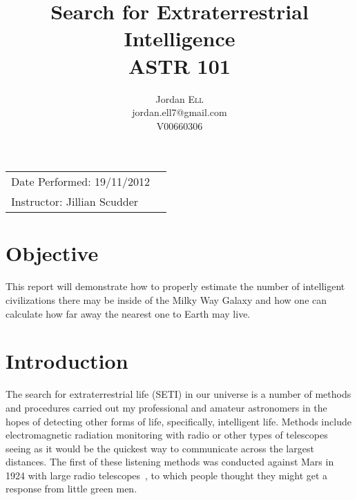 \documentclass{article}
\title{Search for Extraterrestrial Intelligence \\ ASTR 101} %
\author{Jordan \textsc{Ell} \\ jordan.ell7@gmail.com \\ V00660306} %
\begin{document}
\maketitle %

\begin{tabular}{lr}
Date Performed: 19/11/2012\\ %
Instructor: Jillian Scudder %
\end{tabular}

\setlength\parindent{0pt} %

\renewcommand{\labelenumi}{\alph{enumi}.} %


\section{Objective}

This report will demonstrate how to properly estimate the number of intelligent civilizations there may be inside of the Milky Way Galaxy and
how one can calculate how far away the nearest one to Earth may live. \\
 

\section{Introduction}

The search for extraterrestrial life (SETI) in our universe is a number of methods and procedures carried out my professional and amateur
astronomers in the hopes of detecting other forms of life, specifically, intelligent life. Methods include electromagnetic radiation
monitoring with radio or other types of telescopes~\cite{Peter:2006} seeing as it would be the quickest way to communicate
across the largest distances. The first of these listening methods was conducted against Mars in 1924 with large radio telescopes~\cite{Dick:1999}, to which
people thought they might get a response from little green men.\\
\end{document}
